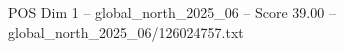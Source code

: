 \begin{textsample}{POS Dim 1 – global\_north\_2025\_06 – Score 39.00 – global\_north\_2025\_06/126024757.txt}
\end{textsample}
